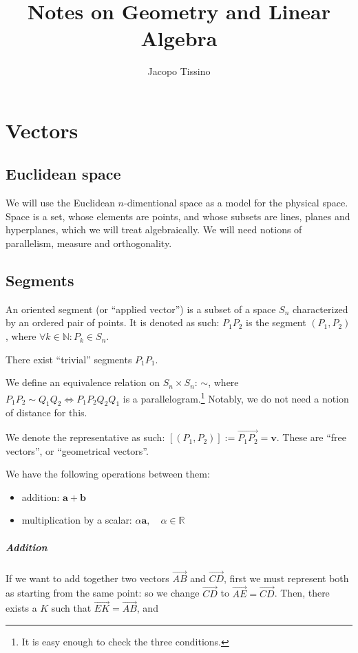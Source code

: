 \documentclass[12pt,a4paper]{report}
\author{Jacopo Tissino}
\title{Notes on Geometry and Linear Algebra}
\numberwithin{equation}{section}
\theoremstyle{definition}
\theoremstyle{remark}
\begin{document}
\maketitle

\chapter{Vectors}

\section{Euclidean space}

We will use the Euclidean $n$-dimentional space as a model for the physical space.
Space is a set, whose elements are points, and whose subsets are lines, planes and hyperplanes, which we will treat algebraically. 
We will need notions of parallelism, measure and orthogonality.

\section{Segments}

An oriented segment (or ``applied vector'') is a subset of a space $S_n$ characterized by an ordered pair of points. It is denoted as such: $P_1 P_2$ is the segment $(P_1, P_2 )$, where $\forall k \in \mathbb{N}: P_k \in S_n$.

There exist ``trivial'' segments $P_1 P_1$.

We define an equivalence relation on $S_n \times S_n$: $\sim$, where $P_1 P_2 \sim Q_1 Q_2 \iff P_1 P_2 Q_2 Q_1$ is a parallelogram.\footnote{It is easy enough to check the three conditions.} Notably, we do not need a notion of distance for this.

We denote the representative as such: $[ ( P_1, P_2 ) ] := \overrightarrow{P_1 P_2} = \mathbf{v}$. These are ``free vectors'', or ``geometrical vectors''.

We have the following operations between them:

\begin{itemize}
\item addition: $\mathbf{a} + \mathbf{b}$
\item multiplication by a scalar: $\alpha \mathbf{a},\quad \alpha\in \mathbb{R}$
\end{itemize}

\paragraph{Addition} If we want to add together two vectors $\overrightarrow{AB}$ and $\overrightarrow{CD}$, first we must represent both as starting from the same point: so we change $\overrightarrow{CD}$ to $\overrightarrow{AE} = \overrightarrow{CD}$. Then, there exists a $K$ such that $\overrightarrow{EK} = \overrightarrow{AB}$, and
\end{document}
